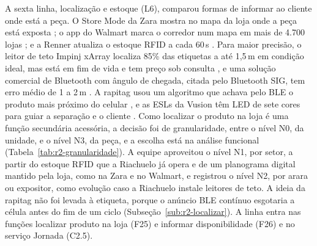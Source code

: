 A sexta linha, localização e estoque (L6), comparou formas de informar ao cliente onde está a peça. O Store Mode da Zara mostra no mapa da loja onde a peça está exposta \cite{inditex2021storemode}; o app do Walmart marca o corredor num mapa em mais de 4.700 lojas \cite{walmart2019mapas}; e a Renner atualiza o estoque RFID a cada 60\,s \cite{infomoney2024renner}. Para maior precisão, o leitor de teto Impinj xArray localiza 85\% das etiquetas a até 1,5\,m em condição ideal, mas está em fim de vida e tem preço sob consulta \cite{atlasrfid2026xarray}, e uma solução comercial de Bluetooth com ângulo de chegada, citada pelo Bluetooth SIG, tem erro médio de 1 a 2\,m \cite{bluetooth2022direction}. A rapitag usou um algoritmo que achava pelo BLE o produto mais próximo do celular \cite{storesshops2019rapitag}, e as ESLs da Vusion têm LED de sete cores para guiar a separação e o cliente \cite{vusion2026esl}. Como localizar o produto na loja é uma função secundária acessória, a decisão foi de granularidade, entre o nível N0, da unidade, e o nível N3, da peça, e a escolha está na análise funcional (Tabela~\ref{tab:r2-granularidade}). A equipe aproveitou o nível N1, por setor, a partir do estoque RFID que a Riachuelo já opera e de um planograma digital mantido pela loja, como na Zara e no Walmart, e registrou o nível N2, por arara ou expositor, como evolução caso a Riachuelo instale leitores de teto. A ideia da rapitag não foi levada à etiqueta, porque o anúncio BLE contínuo esgotaria a célula antes do fim de um ciclo (Subseção~\ref{sub:r2-localizar}). A linha entra nas funções localizar produto na loja (F25) e informar disponibilidade (F26) e no serviço Jornada (C2.5).

